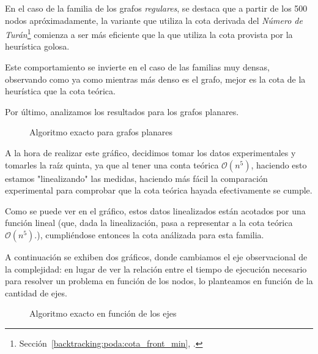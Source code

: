 \par En el caso de la familia de los grafos \emph{regulares}, se destaca que a
    partir de los 500 nodos apr\'oximadamente, la variante que utiliza la cota
    derivada del \emph{N\'umero de Tur\'an}\footnote{Secci\'on~\ref{backtracking:poda:cota_front_min},
    \emph{}.} comienza a ser m\'as
    eficiente que la que utiliza la cota provista por la heur\'istica golosa.

\par Este comportamiento se invierte en el caso de las familias muy densas,
    observando como ya como mientras m\'as denso es el grafo, mejor es la cota
    de la heur\'istica que la cota te\'orica.

\bigskip

\par Por \'ultimo, analizamos los resultados para los grafos planares.

\begin{figure}[H]
    \centering
    \fontsize{8}{10}\selectfont
    \resizebox{1.0\textwidth}{!}{}
    \caption{Algoritmo exacto para grafos planares}
\end{figure}

\par A la hora de realizar este gr\'afico, decidimos tomar los datos experimentales
    y tomarles la ra\'iz quinta, ya que al tener una conta te\'orica
    $\mathcal O(n^5)$, haciendo esto estamos "linealizando" las medidas, haciendo
    m\'as f\'acil la comparaci\'on experimental para comprobar que la cota te\'orica
    hayada efectivamente se cumple.

\par Como se puede ver en el gr\'afico, estos datos linealizados est\'an acotados
    por una funci\'on lineal (que, dada la linealizaci\'on, pasa a representar a
    la cota te\'orica $\mathcal O(n^5)$.), cumpli\'endose entonces la cota an\'alizada
    para esta familia.

\bigskip

\par A continuaci\'on se exhiben dos gr\'aficos, donde cambiamos el eje observacional
    de la complejidad: en lugar de ver la relaci\'on entre el tiempo de ejecuci\'on
    necesario para resolver un problema en funci\'on de los nodos, lo planteamos en
    funci\'on de la cantidad de ejes.

\begin{figure}[H]
    \centering
    \fontsize{8}{10}\selectfont
    \resizebox{1.0\textwidth}{!}{}
    \caption{Algoritmo exacto en funci\'on de los ejes}
\end{figure}

